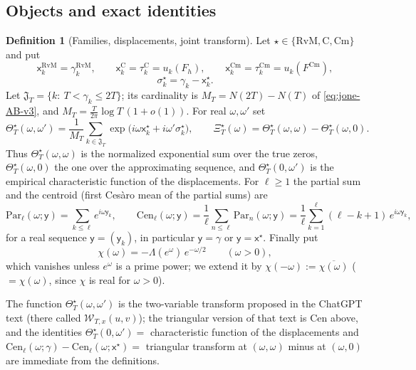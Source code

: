 \documentclass[11pt,a4paper]{article}
\numberwithin{equation}{section}
\theoremstyle{definition}
\newtheorem{definition}[theorem]{Definition}
\theoremstyle{remark}
\newcommand{\Cm}{\mathrm{Cm}}
\begin{document}
\subsection{Objects and exact identities}\label{sec:v9-objects}
\begin{definition}[Families, displacements, joint transform]\label{def:v9-objects}
Let $\star\in\{\mathrm{RvM},\mathrm C,\Cm\}$ and put
\begin{equation}
\mathsf x_k^{\mathrm{RvM}}=\gamma_k^{\mathrm{RvM}},\qquad
\mathsf x_k^{\mathrm C}=\tau_k^{\mathrm C}=u_k(F_h),\qquad
\mathsf x_k^{\Cm}=\tau_k^{\Cm}=u_k(F^{\Cm}),
\end{equation}
\begin{equation}
\sigma_k^\star=\gamma_k-\mathsf x_k^\star .
\end{equation}
Let $\mathfrak J_T=\{k:\ T<\gamma_k\le2T\}$; its cardinality is $M_T=N(2T)-N(T)$ of \eqref{eq:jone-AB-v3}, and $M_T=\frac{T}{2\pi}\log T\,(1+o(1))$. For real $\omega,\omega'$ set
\begin{equation}\label{eq:v9-Theta}
\Theta_T^\star(\omega,\omega')=\frac1{M_T}\sum_{k\in\mathfrak J_T}
\exp\bigl(i\omega\mathsf x_k^\star+i\omega'\sigma_k^\star\bigr),\qquad
\Xi_T^\star(\omega)=\Theta_T^\star(\omega,\omega)-\Theta_T^\star(\omega,0).
\end{equation}
Thus $\Theta_T^\star(\omega,\omega)$ is the normalized exponential sum over the true zeros, $\Theta_T^\star(\omega,0)$ the one over the approximating sequence, and $\Theta_T^\star(0,\omega')$ is the empirical characteristic function of the displacements. For $\ell\ge1$ the partial sum and the centroid (first Ces\`aro mean of the partial sums) are
\begin{equation}\label{eq:v9-Cen}
\mathrm{Par}_\ell(\omega;\mathsf y)=\sum_{k\le\ell}e^{i\omega \mathsf y_k},\qquad
\mathrm{Cen}_\ell(\omega;\mathsf y)=\frac1\ell\sum_{n\le\ell}\mathrm{Par}_n(\omega;\mathsf y)
=\frac1\ell\sum_{k=1}^\ell(\ell-k+1)\,e^{i\omega \mathsf y_k},
\end{equation}
for a real sequence $\mathsf y=(\mathsf y_k)$, in particular $\mathsf y=\gamma$ or $\mathsf y=\mathsf x^\star$. Finally put
\begin{equation}\label{eq:v9-chi}
\chi(\omega)=-\Lambda(e^{\omega})\,e^{-\omega/2}\qquad(\omega>0),
\end{equation}
which vanishes unless $e^\omega$ is a prime power; we extend it by $\chi(-\omega):=\overline{\chi(\omega)}$ ($=\chi(\omega)$, since $\chi$ is real for $\omega>0$).
\end{definition}
The function $\Theta_T^\star(\omega,\omega')$ is the two-variable transform proposed in the ChatGPT text (there called $\mathcal W_{T,x}(u,v)$); the triangular version of that text is $\mathrm{Cen}$ above, and the identities
$\Theta_T^\star(0,\omega')=$ characteristic function of the displacements and $\mathrm{Cen}_\ell(\omega;\gamma)-\mathrm{Cen}_\ell(\omega;\mathsf x^\star)=$ triangular transform at $(\omega,\omega)$ minus at $(\omega,0)$ are immediate from the definitions.
\end{document}
